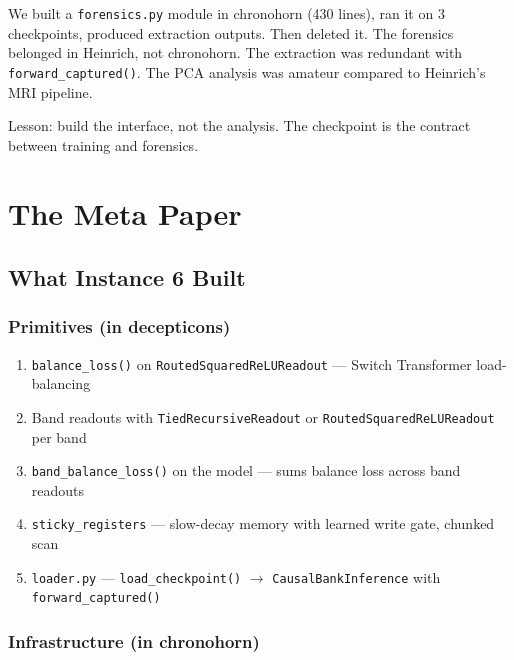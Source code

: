 \documentclass[11pt,a4paper]{report}
\begin{document}
We built a \texttt{forensics.py} module in chronohorn (430 lines), ran it on 3 checkpoints, produced extraction outputs. Then deleted it. The forensics belonged in Heinrich, not chronohorn. The extraction was redundant with \texttt{forward\_captured()}. The PCA analysis was amateur compared to Heinrich's MRI pipeline.

Lesson: build the interface, not the analysis. The checkpoint is the contract between training and forensics.

\part{The Meta Paper}

\chapter{What Instance 6 Built}

\section{Primitives (in decepticons)}

\begin{enumerate}[nosep]
\item \texttt{balance\_loss()} on \texttt{RoutedSquaredReLUReadout} --- Switch Transformer load-balancing
\item Band readouts with \texttt{TiedRecursiveReadout} or \texttt{RoutedSquaredReLUReadout} per band
\item \texttt{band\_balance\_loss()} on the model --- sums balance loss across band readouts
\item \texttt{sticky\_registers} --- slow-decay memory with learned write gate, chunked scan
\item \texttt{loader.py} --- \texttt{load\_checkpoint()} $\to$ \texttt{CausalBankInference} with \texttt{forward\_captured()}
\end{enumerate}

\section{Infrastructure (in chronohorn)}
\end{document}
